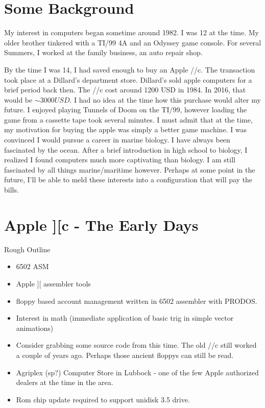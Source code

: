 
\section{Some  Background}
My interest in computers began sometime around 1982. I was 12 at the
time. My older brother tinkered with a TI/99 4A and an Odyssey game
console. For several Summers, I worked at the family business, an auto
repair shop. 

By the time I was 14, I had saved enough to buy an Apple
//c. The transaction took place at a Dillard's department store. Dillard's
sold apple computers for a brief period back then. The //c
cost around 1200 USD in 1984. In 2016, that would be ${\sim} 3000 USD$.
I had no idea at the time how this purchase would alter my future.
I enjoyed playing Tunnels of Doom on the TI/99, however loading the 
game from a cassette tape took several minutes. I must admit that at
the time, my motivation for buying the apple was simply a better game
machine. I was convinced I would pursue a career in marine 
biology. I have always been fascinated by the ocean. After a brief 
introduction in high school to biology, I realized I found computers 
much more captivating than biology. I am still fascinated by
all things marine/maritime however. Perhaps at some point in the
future, I'll be able to meld these interests into a configuration that
will pay the bills.

\section{Apple ][c - The Early Days}
	Rough Outline
	\begin{itemize}
	\item 6502 ASM
	\item Apple ][ assembler tools
	\item floppy based account management written in 6502 assembler with PRODOS.
	\item Interest in math (immediate application of basic trig in simple vector animations)
	\item Consider grabbing some source code from this time. The
          old //c still worked a couple of years ago. Perhaps those
          ancient floppys can still be read.
       \item Agriplex (sp?) Computer Store in Lubbock - one of the few Apple
         authorized dealers at the time in the area.
       \item Rom chip update required to support unidisk 3.5 drive.
	\end{itemize}
